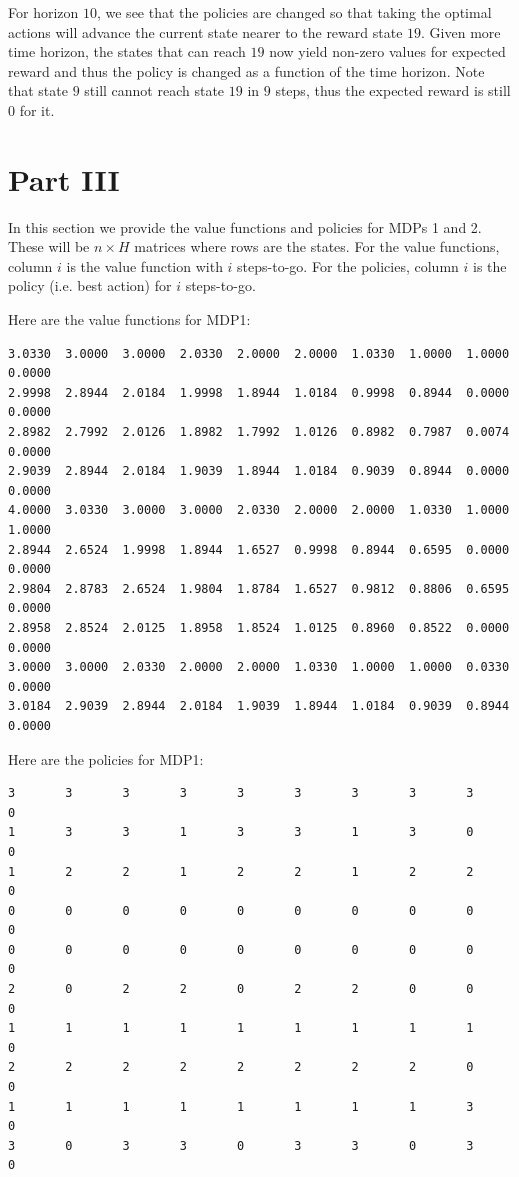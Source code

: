 \documentclass[paper=a4, fontsize=11pt]{scrartcl}
\begin{document}
For horizon $10$, we see that the policies are changed so that taking the optimal actions will advance the current state nearer to the reward state $19$. Given more time horizon, the states that can reach $19$ now yield non-zero values for expected reward and thus the policy is changed as a function of the time horizon. Note that state $9$ still cannot reach state $19$ in $9$ steps, thus the expected reward is still $0$ for it.

\section{Part III}

In this section we provide the value functions and policies for MDPs 1 and 2. These will be $n \times H$ matrices where rows are the states. For the value functions, column $i$ is the value function with $i$ steps-to-go. For the policies, column $i$ is the policy (i.e. best action) for $i$ steps-to-go.

Here are the value functions for MDP1:

\begin{verbatim}
3.0330  3.0000  3.0000  2.0330  2.0000  2.0000  1.0330  1.0000  1.0000  0.0000
2.9998  2.8944  2.0184  1.9998  1.8944  1.0184  0.9998  0.8944  0.0000  0.0000
2.8982  2.7992  2.0126  1.8982  1.7992  1.0126  0.8982  0.7987  0.0074  0.0000
2.9039  2.8944  2.0184  1.9039  1.8944  1.0184  0.9039  0.8944  0.0000  0.0000
4.0000  3.0330  3.0000  3.0000  2.0330  2.0000  2.0000  1.0330  1.0000  1.0000
2.8944  2.6524  1.9998  1.8944  1.6527  0.9998  0.8944  0.6595  0.0000  0.0000
2.9804  2.8783  2.6524  1.9804  1.8784  1.6527  0.9812  0.8806  0.6595  0.0000
2.8958  2.8524  2.0125  1.8958  1.8524  1.0125  0.8960  0.8522  0.0000  0.0000
3.0000  3.0000  2.0330  2.0000  2.0000  1.0330  1.0000  1.0000  0.0330  0.0000
3.0184  2.9039  2.8944  2.0184  1.9039  1.8944  1.0184  0.9039  0.8944  0.0000
\end{verbatim}

Here are the policies for MDP1:

\begin{verbatim}
3       3       3       3       3       3       3       3       3       0
1       3       3       1       3       3       1       3       0       0
1       2       2       1       2       2       1       2       2       0
0       0       0       0       0       0       0       0       0       0
0       0       0       0       0       0       0       0       0       0
2       0       2       2       0       2       2       0       0       0
1       1       1       1       1       1       1       1       1       0
2       2       2       2       2       2       2       2       0       0
1       1       1       1       1       1       1       1       3       0
3       0       3       3       0       3       3       0       3       0
\end{verbatim}
\end{document}
